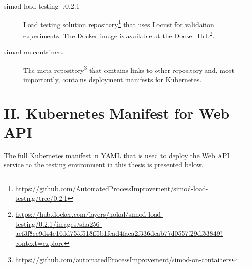 \documentclass[12pt]{article}
\begin{document}
\begin{description}
    \item[simod-load-testing~v0.2.1] Load testing solution repository\footnote{\href{https://github.com/AutomatedProcessImprovement/simod-load-testing/tree/0.2.1}{https://github.com/AutomatedProcessImprovement/simod-load-testing/tree/0.2.1}} that uses Locust for validation experiments. The Docker image is available at the Docker Hub\footnote{\href{https://hub.docker.com/layers/nokal/simod-load-testing/0.2.1/images/sha256-aef3f8ce9d44e16dd753f518ff5b1fead4faca2f336deab77d0557f29df83849?context=explore}{https://hub.docker.com/layers/nokal/simod-load-testing/0.2.1/images/sha256-aef3f8ce9d44e16dd753f518ff5b1fead4faca2f336deab77d0557f29df83849?context=explore}}.
    
    \item[simod-on-containers] The meta-repository\footnote{\href{https://github.com/automatedProcessImprovement/simod-on-containers}{https://github.com/automatedProcessImprovement/simod-on-containers}} that contains links to other repository and, most importantly, contains deployment manifests for Kubernetes.
\end{description}

\clearpage
\section*{II. Kubernetes Manifest for Web API} \label{ch:appendix_web_api_manifest}

The full Kubernetes manifest in YAML that is used to deploy the Web API service to the testing environment in this thesis is presented below.
\end{document}
